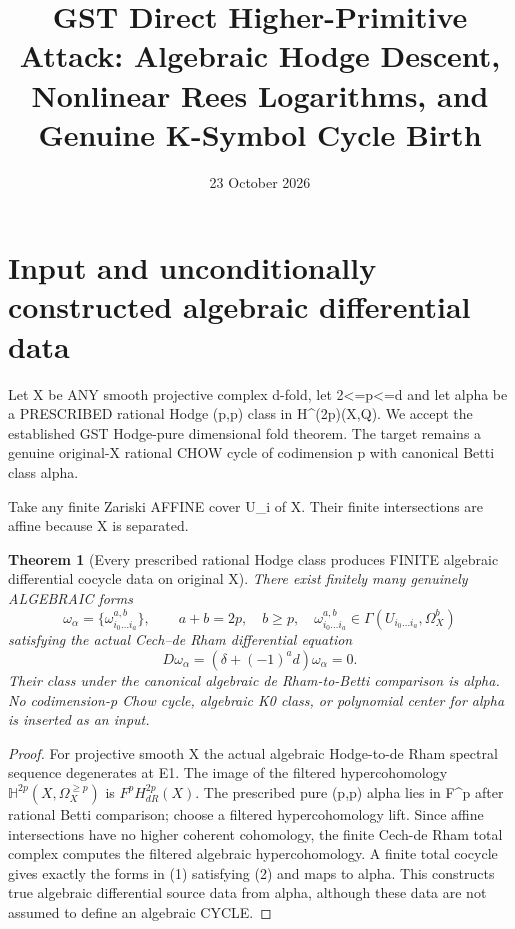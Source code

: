 \documentclass[11pt]{article}
\title{GST Direct Higher-Primitive Attack:
Algebraic Hodge Descent, Nonlinear Rees Logarithms,
and Genuine K-Symbol Cycle Birth}
\date{23 October 2026}
\newtheorem{theorem}{Theorem}[section]
\begin{document}
\maketitle

\section{Input and unconditionally constructed algebraic differential data}
Let X be ANY smooth projective complex d-fold,
let 2<=p<=d and let alpha be a PRESCRIBED rational
Hodge (p,p) class in H^(2p)(X,Q).
We accept the established GST Hodge-pure dimensional
fold theorem. The target remains a genuine
original-X rational CHOW cycle of codimension p
with canonical Betti class alpha.

Take any finite Zariski AFFINE cover U_i of X.
Their finite intersections are affine because
X is separated.

\begin{theorem}[Every prescribed rational Hodge class produces FINITE algebraic differential cocycle data on original X]
There exist finitely many genuinely ALGEBRAIC
forms
\[
 \boxed{
 \omega_\alpha=\{
 \omega^{a,b}_{i_0\dots i_a}\},\qquad
 a+b=2p,\quad b\ge p,\quad
 \omega^{a,b}_{i_0\dots i_a}
 \in\Gamma(U_{i_0\dots i_a},\Omega_X^b)
 }                                                     \tag{1}
\]
satisfying the actual Cech--de Rham
differential equation
\[
 \boxed{D\omega_\alpha
         =(\delta+(-1)^a d)\omega_\alpha=0.}      \tag{2}
\]
Their class under the canonical algebraic
de Rham-to-Betti comparison is alpha.
No codimension-p Chow cycle, algebraic
K0 class, or polynomial center for alpha
is inserted as an input.
\end{theorem}
\begin{proof}
For projective smooth X the actual algebraic
Hodge-to-de Rham spectral sequence degenerates
at E1. The image of the filtered hypercohomology
$\mathbb H^{2p}(X,\Omega_X^{\ge p})$ is
$F^pH^{2p}_{dR}(X)$.
The prescribed pure (p,p) alpha lies in F^p
after rational Betti comparison; choose
a filtered hypercohomology lift.
Since affine intersections have no higher
coherent cohomology, the finite Cech-de Rham
total complex computes the filtered algebraic
hypercohomology. A finite total cocycle gives
exactly the forms in (1) satisfying (2)
and maps to alpha.
This constructs true algebraic differential
source data from alpha, although these data
are not assumed to define an algebraic CYCLE.
\end{proof}
\end{document}

